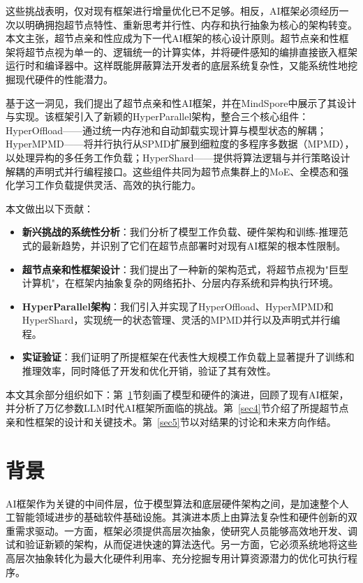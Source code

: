\documentclass[11pt]{article}
\begin{document}
这些挑战表明，仅对现有框架进行增量优化已不足够。相反，AI框架必须经历一次以明确拥抱超节点特性、重新思考并行性、内存和执行抽象为核心的架构转变。本文主张，超节点亲和性应成为下一代AI框架的核心设计原则。超节点亲和性框架将超节点视为单一的、逻辑统一的计算实体，并将硬件感知的编排直接嵌入框架运行时和编译器中。这样既能屏蔽算法开发者的底层系统复杂性，又能系统性地挖掘现代硬件的性能潜力。

基于这一洞见，我们提出了超节点亲和性AI框架，并在MindSpore中展示了其设计与实现。该框架引入了新颖的HyperParallel架构，整合三个核心组件：HyperOffload——通过统一内存池和自动卸载实现计算与模型状态的解耦；HyperMPMD——将并行执行从SPMD扩展到细粒度的多程序多数据（MPMD），以处理异构的多任务工作负载；HyperShard——提供将算法逻辑与并行策略设计解耦的声明式并行编程接口。这些组件共同为超节点集群上的MoE、全模态和强化学习工作负载提供灵活、高效的执行能力。

本文做出以下贡献：
\begin{itemize}
    \item \textbf{新兴挑战的系统性分析}：我们分析了模型工作负载、硬件架构和训练-推理范式的最新趋势，并识别了它们在超节点部署时对现有AI框架的根本性限制。
    \item \textbf{超节点亲和性框架设计}：我们提出了一种新的架构范式，将超节点视为"巨型计算机"，在框架内抽象复杂的网络拓扑、分层内存系统和异构执行环境。
    \item \textbf{HyperParallel架构}：我们引入并实现了HyperOffload、HyperMPMD和HyperShard，实现统一的状态管理、灵活的MPMD并行以及声明式并行编程。
    \item \textbf{实证验证}：我们证明了所提框架在代表性大规模工作负载上显著提升了训练和推理效率，同时降低了开发和优化开销，验证了其有效性。
\end{itemize}

本文其余部分组织如下：第~\ref{sec2}节刻画了模型和硬件的演进，回顾了现有AI框架，并分析了万亿参数LLM时代AI框架所面临的挑战。第~\ref{sec4}节介绍了所提超节点亲和性框架的设计和关键技术。第~\ref{sec5}节以对结果的讨论和未来方向作结。

\section{背景}
\label{sec2}

AI框架作为关键的中间件层，位于模型算法和底层硬件架构之间，是加速整个人工智能领域进步的基础软件基础设施。其演进本质上由算法复杂性和硬件创新的双重需求驱动。一方面，框架必须提供高层次抽象，使研究人员能够高效地开发、调试和验证新颖的架构，从而促进快速的算法迭代。另一方面，它必须系统地将这些高层次抽象转化为最大化硬件利用率、充分挖掘专用计算资源潜力的优化可执行程序。
\end{document}
